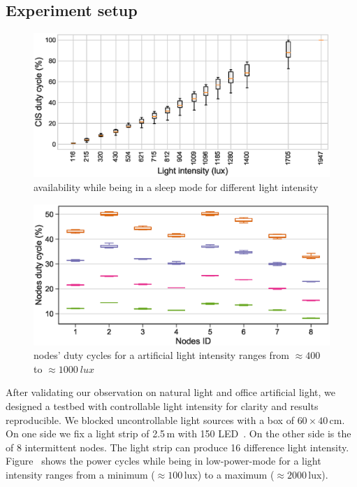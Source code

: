 \subsection{Experiment setup}
\label{sec:experiment_setup}
\begin{figure}[t]
		\centering
		\includegraphics[width=\columnwidth]{figures/cis_dutyCycle.eps}
		\caption{\fullcim availability while being in a sleep mode for different light intensity }
		\label{fig:cis_dutyCycle}
\end{figure} 
\begin{figure}[t]
		\centering
		\includegraphics[width=\columnwidth]{figures/nodes_duty_cycles.eps}
		\caption{\fullcim nodes' duty cycles for a artificial light intensity ranges from $\approx 400$ to $\approx \SI{1000}{lux}$}
		\label{fig:solarPwrCoIS}
\end{figure} 
After validating our observation on natural light and office artificial light, we designed a testbed with controllable light intensity for clarity and results reproducible. We blocked uncontrollable light sources with a box of $60 \times 40$\,cm. On one side we fix a light strip of 2.5\,m with 150 LED~\cite{}. On the other side is the \fullcim of 8 intermittent nodes. The light strip can produce 16 difference light intensity. Figure~\cite{fig:cis_dutyCycle} shows the \cim power cycles while being in low-power-mode for a light intensity ranges from a minimum ($\approx 100$\,lux) to a maximum ($\approx 2000$\,lux). 


